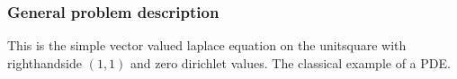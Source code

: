 \subsubsection{General problem description}
This is the simple vector valued laplace equation on the unitsquare with righthandside $(1,1)$ and zero dirichlet values. The classical example of a PDE.
